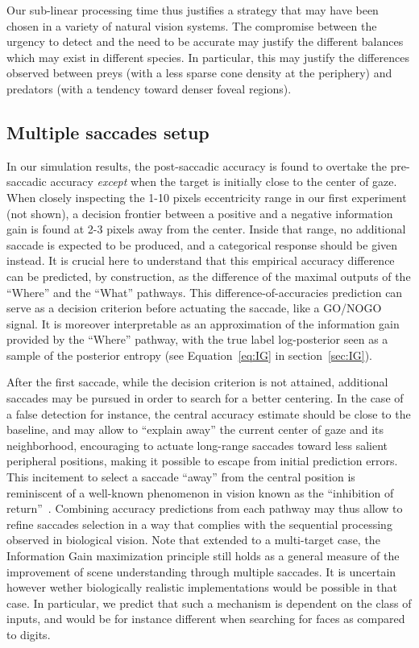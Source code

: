 Our sub-linear processing time thus justifies a strategy that may have been chosen in a variety of natural vision systems. The compromise between the urgency to detect and the need to be accurate may justify the different balances which may exist in different species. In particular, this may justify the differences observed between preys (with a less sparse cone density at the periphery) and predators (with a tendency toward  denser foveal regions). %

%
\subsection{Multiple saccades setup}
%
In our simulation results, the post-saccadic accuracy is found to overtake the pre-saccadic accuracy \emph{except} when the target is initially close to the center of gaze. When closely inspecting the 1-10 pixels eccentricity range in our first experiment (not shown), a decision frontier between a positive and a negative information gain is found at 2-3 pixels away from the center. Inside that range, no additional saccade is expected to be produced, and a categorical response should be given instead. It is crucial here to understand that this empirical accuracy difference can be predicted, by construction, as the difference of the maximal outputs of the ``Where'' and the ``What'' pathways. This difference-of-accuracies prediction can serve as a decision criterion before actuating the saccade, like a GO/NOGO signal. It is moreover interpretable as an approximation of the information gain provided by the ``Where'' pathway, with the true label log-posterior seen as a sample of the posterior entropy (see Equation~\ref{eq:IG} in section~\ref{sec:IG}).

After the first saccade, while the decision criterion is not attained, additional saccades may be pursued in order to search for a better centering. In the case of a false detection for instance, the central accuracy estimate should be close to the baseline, and may allow to ``explain away'' the current center of gaze and its neighborhood, encouraging to actuate long-range saccades toward less salient peripheral positions, making it possible to escape from initial prediction errors. This incitement to select a saccade ``away'' from the central position is reminiscent of a well-known phenomenon in vision known as the ``inhibition of return''~\cite{Itti01}. Combining accuracy predictions from each pathway may thus allow to refine saccades selection in a way that complies with the sequential processing observed in biological vision. Note that extended to a multi-target case, the Information Gain maximization principle still holds as a general measure of the improvement of scene understanding through multiple saccades. It is uncertain however wether biologically realistic implementations would be possible in that case. In particular, we predict that such a mechanism is dependent on the class of inputs, and would be for instance different when searching for faces as compared to digits.


